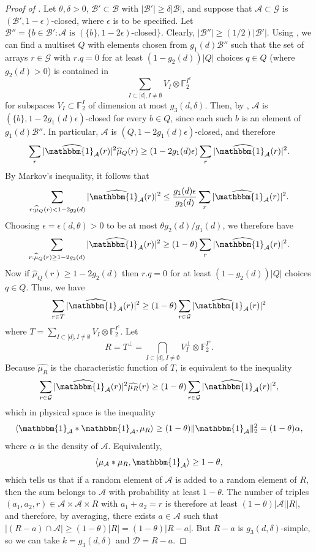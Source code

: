 \documentclass{toc}
\newcommand\eps{\epsilon}  %
\newcommand\F{\mathbb{F}}
\renewcommand\a{\alpha}
\renewcommand\d{\delta}
\newcommand{\ind}{\mathbbm{1}}
\newcommand \hcA {{\widehat {\ind_{\mathcal A}}}}
\newcommand \cA{\mathcal A}
\newcommand \cB{\mathcal B}
\newcommand \cD{\mathcal D}
\newcommand \cG{\mathcal G}
\newcommand \s{\subset}
\begin{document}
\begin{proof}[Proof of ]
  Let $\theta,\d>0$, $\cB'\s \cB$ with $|\cB'|\geq \d|\cB|$, and suppose that $\cA\s \cG$ is $(\cB',1-\eps)$-closed, where $\eps$ is to be specified. Let $\cB''=\{b\in \cB': \cA \text{ is } (\{b\},1-2\eps) \text{-closed}\}$. Clearly, $|\cB''|\geq ({1}/{2})|\cB'|$. Using , we can find a multiset $Q$ with elements chosen from $g_1(d)\cB''$ such that the set of arrays $r\in \cG$ with $r.q=0$ for at least $(1-g_2(d))|Q|$ choices $q\in Q$ (where $g_2(d)>0$) is contained in
  \[
    \sum_{I\subset \lbrack d\rbrack, I\neq \emptyset} V_I\otimes \F_2^{I^c}
  \]
  for subspaces $V_I\s \F_2^{I}$ of dimension at most
  $g_3(d,\d)$. Then, by , $\cA$ is
  $(\{b\},1-2g_1(d)\eps)$-closed for every $b\in Q$, since each such $b$
  is an element of $g_1(d)\cB''$. In particular, $\cA$ is
  $(Q,1-2g_1(d)\eps)$-closed, and therefore
	\[\sum_r|\hcA(r)|^2\widehat\mu_Q(r)\geq(1-2g_1(d)\eps)\sum_r|\hcA(r)|^2.\]
	By Markov's inequality, it follows that 
	\[\sum_{r:\widehat\mu_Q(r)<1-2g_2(d)}|\hcA(r)|^2\leq\frac{g_1(d)\eps}{g_2(d)}\sum_r|\hcA(r)|^2.\]
	Choosing $\eps=\eps(d,\theta)>0$ to be at most $\theta g_2(d)/g_1(d)$, we therefore have 
	\[\sum_{r:\widehat\mu_Q(r)\geq 1-2g_2(d)}|\hcA(r)|^2\geq(1-\theta)\sum_r|\hcA(r)|^2.\]
	Now if $\widehat\mu_Q(r)\geq 1-2g_2(d)$ then $r.q=0$ for at least $(1-g_2(d))|Q|$ choices $q\in Q$. Thus, we have 
	\begin{equation}
	\sum_{r\in T}|\hcA(r)|^2\geq(1-\theta)\sum_{r\in \cG}|\hcA(r)|^2 \label{eq1}
      \end{equation} where $T=\sum_{I\subset \lbrack d\rbrack, I\neq \emptyset} V_I\otimes \F_2^{I^c}$. Let
      \[
        R=T^{\perp}=\bigcap_{I\subset \lbrack d\rbrack, I\neq \emptyset} V_I^{\perp}\otimes \F_2^{I^c}.
      \]
      Because $\widehat{\mu_R}$ is the characteristic function of $T$,
       is equivalent to the inequality
	\[\sum_{r\in \cG}|\hcA(r)|^2\widehat{\mu_R}(r)\geq (1-\theta)\sum_{r\in \cG}|\hcA(r)|^2,\]
	which in physical space is the inequality 
	\[\langle\ind_{\cA}*\ind_{\cA},\mu_R\rangle\geq (1-\theta)\|\ind_{\cA}\|_2^2=(1-\theta)\a,\]
	where $\a$ is the density of $\cA$. Equivalently,
	\[\langle\mu_{\cA}*\mu_R,\ind_{\cA}\rangle\geq 1-\theta,\]
	which tells us that if a random element of $\cA$ is added to a random element of $R$, then the sum belongs to $\cA$ with probability at least $1-\theta$. The number of triples $(a_1,a_2,r)\in \cA\times \cA\times R$ with $a_1+a_2=r$ is therefore at least $(1-\theta)|\cA||R|$, and therefore, by averaging, there exists $a\in \cA$ such that $|(R-a)\cap \cA|\geq (1-\theta)|R|=(1-\theta)|R-a|$. But $R-a$ is $g_3(d,\d)$-simple, so we can take $k=g_3(d,\d)$ and $\cD=R-a$.
\end{proof}
\end{document}
